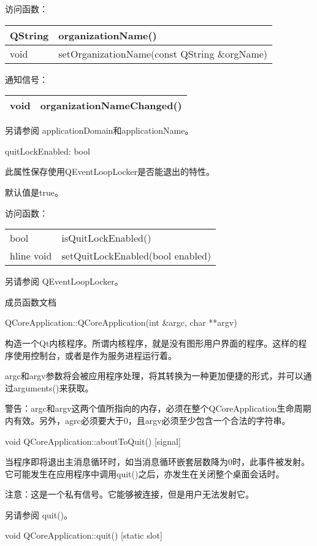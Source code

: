 访问函数：

\begin{tabular}{|l|l|}
\hline
QString&	organizationName()\\
\hline
void&	setOrganizationName(const QString \&orgName)\\
\hline
\end{tabular}

通知信号：

\begin{tabular}{|l|l|}
\hline
void	&organizationNameChanged()\\
\hline
\end{tabular}

另请参阅 applicationDomain和applicationName。

quitLockEnabled: bool

此属性保存使用QEventLoopLocker是否能退出的特性。

默认值是true。

访问函数：

\begin{tabular}{|l|l|}
\hline
bool&	isQuitLockEnabled()\\
hline
void&	setQuitLockEnabled(bool enabled)\\
\hline
\end{tabular}

另请参阅 QEventLoopLocker。

\splitLine

成员函数文档

QCoreApplication::QCoreApplication(int \&argc, char **argv)

构造一个Qt内核程序。所谓内核程序，就是没有图形用户界面的程序。这样的程序使用控制台，或者是作为服务进程运行着。

argc和argv参数将会被应用程序处理，将其转换为一种更加便捷的形式，并可以通过arguments()来获取。

警告：argc和argv这两个值所指向的内存，必须在整个QCoreApplication生命周期内有效。另外，agrc必须要大于0，且argv必须至少包含一个合法的字符串。

void QCoreApplication::aboutToQuit() [signal]

当程序即将退出主消息循环时，如当消息循环嵌套层数降为0时，此事件被发射。它可能发生在应用程序中调用quit()之后，亦发生在关闭整个桌面会话时。

注意：这是一个私有信号。它能够被连接，但是用户无法发射它。

另请参阅 quit()。

void QCoreApplication::quit() [static slot]

